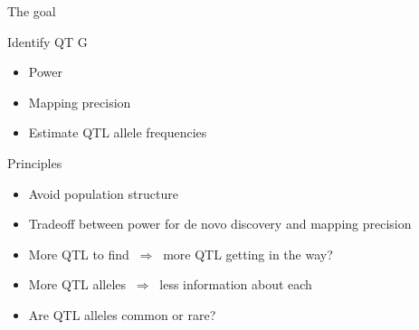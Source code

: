 \documentclass[12pt]{article}
\newcommand{\headsize}{\fontsize{35}{35} \selectfont}
\newcommand{\smallsize}{\fontsize{25}{30} \selectfont}
\newcommand{\smallersize}{\fontsize{20}{25} \selectfont}
\begin{document}
{\newpage

\addtocounter{page}{-1}

\headsize \color{myyellow}
\hfill \begin{minipage}{5.75in}
\centering
The goal
\end{minipage}

\vspace{25mm}

\color{mywhite}
\smallsize

\hfill \begin{minipage}{9.5in}
Identify QT{\color{mypink} G}
\end{minipage}

\vspace{15mm}

\hfill \begin{minipage}{9in}
\color{myblue}
\begin{itemize}
\itemsep24pt
\item Power
\item Mapping precision
\item Estimate QTL allele frequencies
\end{itemize}
\end{minipage}



\newpage


\headsize \color{myyellow}
\hfill \begin{minipage}{5.75in}
\centering
Principles
\end{minipage}

\vspace{25mm}

\color{mywhite}
\smallersize

\hfill \begin{minipage}{10in}
\begin{itemize}
\itemsep24pt
\item Avoid population structure
\item Tradeoff between {\color{myblue} power for de novo discovery}
  and {\color{myblue} mapping precision}
\item More QTL to find $ \ \Rightarrow \ $ more QTL getting in the way?
\item More QTL alleles $ \ \Rightarrow \ $ less information about each
\item Are QTL alleles common or rare?
\end{itemize}
\end{minipage}



}
\end{document}
